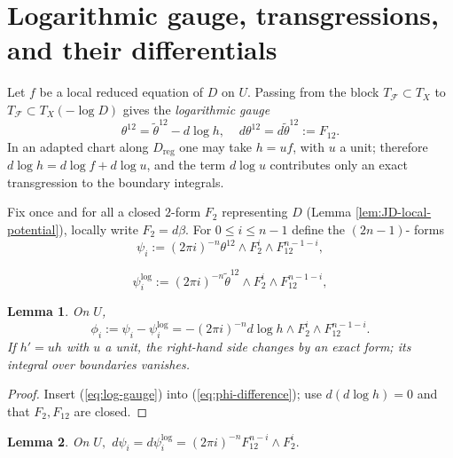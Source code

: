 \documentclass[12pt,reqno,a4paper]{amsart}
\numberwithin{equation}{section}
\theoremstyle{plain}
\newtheorem{lemma}[lemma]{Lemma}
\theoremstyle{definition}
\newcommand{\cF}{\mathcal{F}}
\begin{document}
\section{ Logarithmic gauge, transgressions, and their differentials}

 
Let $f$ be a local reduced equation of $D$ on $U.$ Passing from the block $T_{\cF} \subset T_X$ to $T_{\cF} \subset T_X(- \log D)$ gives the {\it logarithmic gauge}
\begin{equation} \label{eq:log-gauge}
\theta^{12} = \tilde{\theta}^{12} - d \log h, \;\;\;\; d\theta^{12} = d\tilde{\theta}^{12}:= F_{12}. 
\end{equation}
In an adapted chart along \(D_{\mathrm{reg}}\) one may take \(h=uf\), with \(u\) a unit;
therefore \(d\log h=d\log f+d\log u\), and the term \(d\log u\) contributes only an
exact transgression to the boundary integrals.

Fix once and for all a closed $2$-form $F_2$ representing $D$ (Lemma \ref{lem:JD-local-potential}), locally write $F_2= d \beta.$
For $0 \leq i \leq n-1$ define the $(2n-1)$- forms
\begin{equation}
    \psi_i := (2 \pi i)^{-n} \theta^{12} \wedge F_2^i \wedge F^{n-1-i}_{12},
\end{equation}


\begin{equation}
    \psi_i^{\log} := (2 \pi i )^{-n} \tilde{\theta}^{12} \wedge F_2^i \wedge F^{n-1-i}_{12},
\end{equation}

 

\begin{lemma}  \label{lem:exact-difference}
On $U$,
\begin{equation} \label{eq:phi-difference}
\phi_i:= \psi_i -  \psi_i^{\log} = -(2 \pi {   i})^{-n} d \log h \wedge F_2^i \wedge F^{n-1-i}_{12}.
\end{equation}
If $h'=uh$ with $u$ a unit, the right-hand side changes by an exact form; its integral over boundaries vanishes. 
\end{lemma}

\begin{proof}
Insert (\ref{eq:log-gauge}) into (\ref{eq:phi-difference}); use $d(d \log h)=0$ and that $F_2, F_{12}$ are closed.
\end{proof}

 

\begin{lemma}   \label{lem:differentials}
On $U,$
$
d \psi_i = d \psi_i^{\log} = (2 \pi { i})^{-n} F^{n-i}_{12} \wedge F_2^i.
$
\end{lemma}
\end{document}
